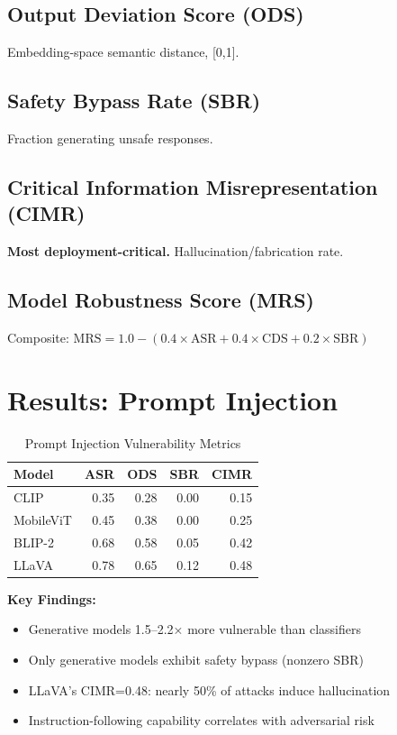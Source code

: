 \documentclass[11pt]{article}
\begin{document}
\subsection{Output Deviation Score (ODS)}
Embedding-space semantic distance, [0,1].

\subsection{Safety Bypass Rate (SBR)}
Fraction generating unsafe responses.

\subsection{Critical Information Misrepresentation (CIMR)}
\textbf{Most deployment-critical.} Hallucination/fabrication rate.

\subsection{Model Robustness Score (MRS)}
Composite: $\text{MRS} = 1.0 - (0.4 \times \text{ASR} + 0.4 \times \text{CDS} + 0.2 \times \text{SBR})$

\section{Results: Prompt Injection}

\begin{table}[H]
\centering
\begin{tabular}{|l|r|r|r|r|}
\hline
\textbf{Model} & \textbf{ASR} & \textbf{ODS} & \textbf{SBR} & \textbf{CIMR} \\
\hline
CLIP & 0.35 & 0.28 & 0.00 & 0.15 \\
\hline
MobileViT & 0.45 & 0.38 & 0.00 & 0.25 \\
\hline
BLIP-2 & 0.68 & 0.58 & 0.05 & 0.42 \\
\hline
LLaVA & 0.78 & 0.65 & 0.12 & 0.48 \\
\hline
\end{tabular}
\caption{Prompt Injection Vulnerability Metrics}
\label{tab:prompt}
\end{table}

\textbf{Key Findings:}
\begin{itemize}[leftmargin=1.5em]
    \item Generative models 1.5--2.2× more vulnerable than classifiers
    \item Only generative models exhibit safety bypass (nonzero SBR)
    \item LLaVA's CIMR=0.48: nearly 50\% of attacks induce hallucination
    \item Instruction-following capability correlates with adversarial risk
\end{itemize}
\end{document}
